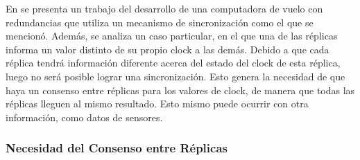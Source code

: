 En \cite{wensley1978sift} se presenta un trabajo del desarrollo de una computadora de vuelo con redundancias que utiliza un mecanismo de sincronización como el que se mencionó. Además, se analiza un caso particular, en el que una de las réplicas informa un valor distinto de su propio clock a las demás. Debido a que cada réplica tendrá información diferente acerca del estado del clock de esta réplica, luego no será posible lograr una sincronización. Esto genera la necesidad de que haya un consenso entre réplicas para los valores de clock, de manera que todas las réplicas lleguen al mismo resultado. Esto mismo puede ocurrir con otra información, como datos de sensores.


\subsubsection{Necesidad del Consenso entre Réplicas}\label{sec:consenso}


